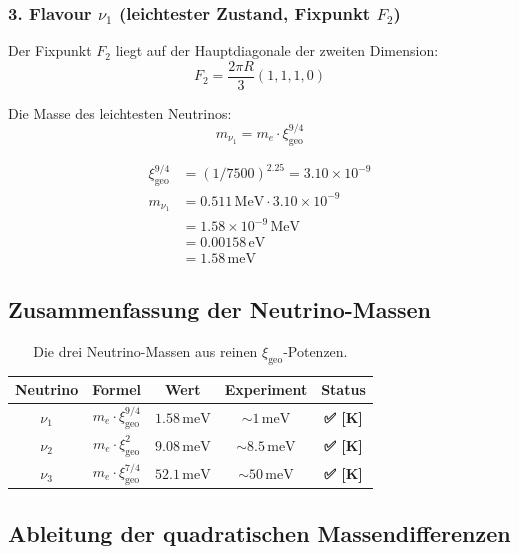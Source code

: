 \documentclass[11pt,a4paper]{article}
\newcommand{\xigeo}{\xi_{\text{geo}}}
\newcommand{\Checkmark}{\textbf{✅ [K]}}
\begin{document}
	\subsubsection{3. Flavour $\nu_1$ (leichtester Zustand, Fixpunkt $F_2$)}
	
	Der Fixpunkt $F_2$ liegt auf der Hauptdiagonale der zweiten Dimension:
	\begin{equation}
		F_2 = \frac{2\pi R}{3}(1, 1, 1, 0)
	\end{equation}
	
	Die Masse des leichtesten Neutrinos:
	\begin{equation}
		m_{\nu_1} = m_e \cdot \xigeo^{9/4}
	\end{equation}
	
	\begin{align}
		\xigeo^{9/4} &= (1/7500)^{2.25} = 3.10 \times 10^{-9} \\
		m_{\nu_1} &= 0.511\,\text{MeV} \cdot 3.10 \times 10^{-9} \\
		&= 1.58 \times 10^{-9}\,\text{MeV} \\
		&= 0.00158\,\text{eV} \\
		&= 1.58\,\text{meV}
	\end{align}
	
	\subsection{Zusammenfassung der Neutrino-Massen}
	
	\begin{table}[h!]
		\centering
		\caption{Die drei Neutrino-Massen aus reinen $\xigeo$-Potenzen.}
		\label{tab:neutrino_masses}
		\begin{tabular}{c c c c c}
			\toprule
			\textbf{Neutrino} & \textbf{Formel} & \textbf{Wert} & \textbf{Experiment} & \textbf{Status} \\
			\midrule
			$\nu_1$ & $m_e \cdot \xigeo^{9/4}$ & $1.58\,\text{meV}$ & $\sim 1\,\text{meV}$ & \Checkmark \\
			$\nu_2$ & $m_e \cdot \xigeo^{2}$ & $9.08\,\text{meV}$ & $\sim 8.5\,\text{meV}$ & \Checkmark \\
			$\nu_3$ & $m_e \cdot \xigeo^{7/4}$ & $52.1\,\text{meV}$ & $\sim 50\,\text{meV}$ & \Checkmark \\
			\bottomrule
		\end{tabular}
	\end{table}
	
	\subsection{Ableitung der quadratischen Massendifferenzen}
	
\end{document}

